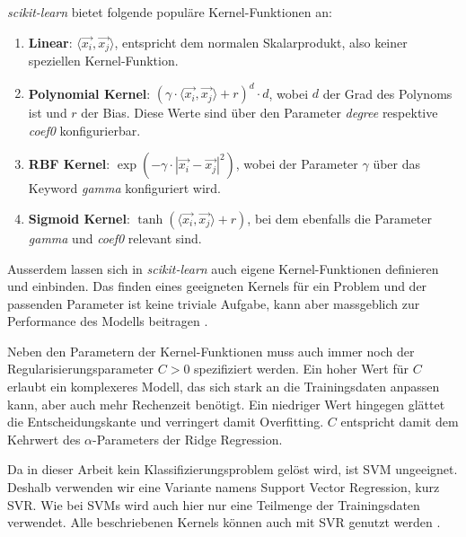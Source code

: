 \documentclass[10pt, a4paper]{article}
\begin{document}
\emph{scikit-learn} bietet folgende populäre Kernel-Funktionen an:
\begin{enumerate}
	\item \textbf{Linear}: \(\langle \vec{x_i}, \vec{x_j} \rangle\), entspricht dem normalen Skalarprodukt, also keiner speziellen Kernel-Funktion.
	\item \textbf{Polynomial Kernel}: \((\gamma \cdot \langle \vec{x_i}, \vec{x_j} \rangle + r )^d \cdot d\), wobei \(d\) der Grad des Polynoms ist und \(r\) der Bias. Diese Werte sind über den Parameter \textit{degree} respektive \textit{coef0} konfigurierbar. 
	\item \textbf{\ac{RBF} Kernel}: \(\exp(-\gamma \cdot |\vec{x_i} - \vec{x_j}|^2)\), wobei der Parameter \(\gamma\) über das Keyword \textit{gamma} konfiguriert wird.
	\item \textbf{Sigmoid Kernel}: \(\tanh(\langle \vec{x_i}, \vec{x_j} \rangle + r)\), bei dem ebenfalls die Parameter \textit{gamma} und \textit{coef0} relevant sind.
\end{enumerate}
Ausserdem lassen sich in \emph{scikit-learn} auch eigene Kernel-Funktionen definieren und einbinden. Das finden eines geeigneten Kernels für ein Problem und der passenden Parameter ist keine triviale Aufgabe, kann aber massgeblich zur Performance des Modells beitragen \cite{erickimkerneltrick, sklearnsvm}.

Neben den Parametern der Kernel-Funktionen muss auch immer noch der Regularisierungsparameter \(C > 0\) spezifiziert werden. Ein hoher Wert für \(C\) erlaubt ein komplexeres Modell, das sich stark an die Trainingsdaten anpassen kann, aber auch mehr Rechenzeit benötigt. Ein niedriger Wert hingegen glättet die Entscheidungskante und verringert damit Overfitting. \(C\) entspricht damit dem Kehrwert des \(\alpha\)-Parameters der Ridge Regression.

Da in dieser Arbeit kein Klassifizierungsproblem gelöst wird, ist \ac{SVM} ungeeignet. Deshalb verwenden wir eine Variante namens Support Vector Regression, kurz \ac{SVR}. Wie bei \acp{SVM} wird auch hier nur eine Teilmenge der Trainingsdaten verwendet. Alle beschriebenen Kernels können auch mit \ac{SVR} genutzt werden \cite{sklearnsvm}.


\end{document}
